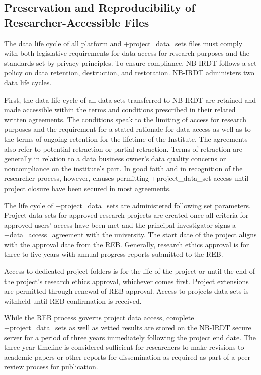 \documentclass[
]{book}
\begin{document}
\hypertarget{preservation-and-reproducibility-of-researcher-accessible-files-1}{%
\subsection{Preservation and Reproducibility of Researcher-Accessible Files}\label{preservation-and-reproducibility-of-researcher-accessible-files-1}}

The data life cycle of all platform and +project\_data\_sets\textbar{} files must comply with both legislative requirements for data access for research purposes and the standards set by privacy principles. To ensure compliance, NB-IRDT follows a set policy on data retention, destruction, and restoration. NB-IRDT administers two data life cycles.

First, the data life cycle of all data sets transferred to NB-IRDT are retained and made accessible within the terms and conditions prescribed in their related written agreements. The conditions speak to the limiting of access for research purposes and the requirement for a stated rationale for data access as well as to the terms of ongoing retention for the lifetime of the Institute. The agreements also refer to potential retraction or partial retraction. Terms of retraction are generally in relation to a data business owner's data quality concerns or noncompliance on the institute's part. In good faith and in recognition of the researcher process, however, clauses permitting +project\_data\_set\textbar{} access until project closure have been secured in most agreements.

The life cycle of +project\_data\_sets\textbar{} are administered following set parameters. Project data sets for approved research projects are created once all criteria for approved users' access have been met and the principal investigator signs a +data\_access\_agreement\textbar{} with the university. The start date of the project aligns with the approval date from the REB. Generally, research ethics approval is for three to five years with annual progress reports submitted to the REB.

Access to dedicated project folders is for the life of the project or until the end of the project's research ethics approval, whichever comes first. Project extensions are permitted through renewal of REB approval. Access to projects data sets is withheld until REB confirmation is received.

While the REB process governs project data access, complete +project\_data\_sets\textbar{} as well as vetted results are stored on the NB-IRDT secure server for a period of three years immediately following the project end date. The three-year timeline is considered sufficient for researchers to make revisions to academic papers or other reports for dissemination as required as part of a peer review process for publication.
\end{document}

